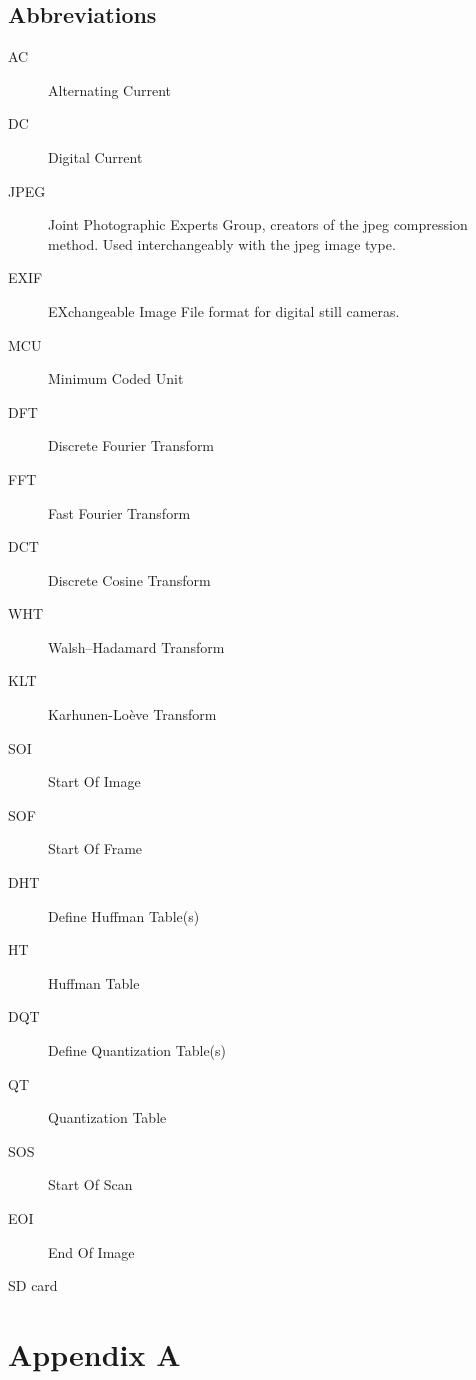 \documentclass[oneside]{ecsgdp}         %
\begin{document}
\section*{Abbreviations} 
\begin{description}
	\item[AC] Alternating Current 
	\item[DC] Digital Current 
	\item[JPEG] Joint Photographic Experts Group, creators of the jpeg compression method. Used interchangeably with the jpeg image type.
	\item[EXIF] EXchangeable Image File format for digital still cameras.
	\item[MCU] Minimum Coded Unit
	\item[DFT] Discrete Fourier Transform
	\item[FFT] Fast Fourier Transform
	\item[DCT] Discrete Cosine Transform
	\item[WHT] Walsh–Hadamard Transform
	\item[KLT] Karhunen-Lo\`eve Transform
	\item[SOI] Start Of Image
	\item[SOF] Start Of Frame
	\item[DHT] Define Huffman Table(s)
	\item[HT] Huffman Table
	\item[DQT] Define Quantization Table(s)
	\item[QT] Quantization Table
	\item[SOS] Start Of Scan
	\item[EOI] End Of Image
	\item[SD card]
\end{description}
\chapter{Appendix A}


\end{document}
